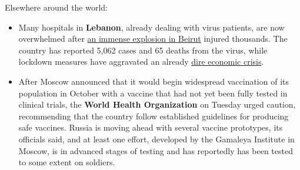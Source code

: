 Elsewhere around the world:

\begin{itemize}
\item
  Many hospitals in \textbf{Lebanon}, already dealing with virus
  patients, are now overwhelmed after
  \href{https://www.nytimes.com/2020/08/04/world/middleeast/beirut-explosion-blast.html}{an
  immense explosion in Beirut} injured thousands. The country has
  reported 5,062 cases and 65 deaths from the virus, while lockdown
  measures have aggravated an already
  \href{https://www.nytimes.com/2020/07/12/world/middleeast/beirut-lebanon-economic-crisis.html}{dire
  economic crisis}.
\item
  After Moscow announced that it would begin widespread vaccination of
  its population in October with a vaccine that had not yet been fully
  tested in clinical trials, the \textbf{World Health Organization} on
  Tuesday urged caution, recommending that the country follow
  established guidelines for producing safe vaccines. Russia is moving
  ahead with several vaccine prototypes, its officials said, and at
  least one effort, developed by the Gamaleya Institute in Moscow, is in
  advanced stages of testing and has reportedly has been tested to some
  extent on soldiers.
\end{itemize}

